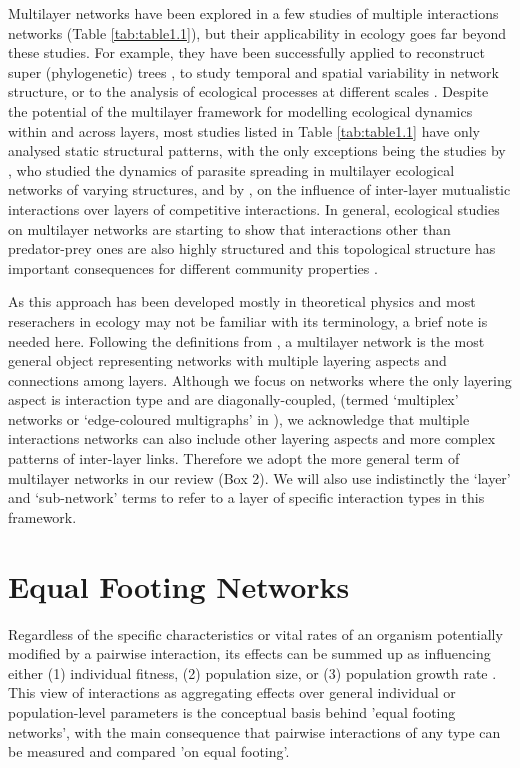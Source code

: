 Multilayer networks have been explored in a few studies of multiple interactions networks (Table \ref{tab:table1.1}), but their applicability in ecology goes far beyond these studies. For example, they have been successfully applied to reconstruct super (phylogenetic) trees \cite{vonHaeseler2012}, to study temporal and spatial variability in network structure, or to the analysis of ecological processes at different scales \cite{Pilosof2017} . Despite the potential of the multilayer framework for modelling ecological dynamics within and across layers, most studies listed in Table \ref{tab:table1.1} have only analysed static structural patterns, with the only exceptions being the studies by \cite{Stella2016}, who studied the dynamics of parasite spreading in multilayer ecological networks of varying structures, and by \cite{Gracia-Lazaro2018}, on the influence of inter-layer mutualistic interactions over layers of competitive interactions. In general, ecological studies on multilayer networks are starting to show that interactions other than predator-prey ones are also highly structured \citep{Melian2009,Kefi2015} and this topological structure has important consequences for different community properties \citep{Pocock2012, Evans2013a, Kefi2016a}.

As this approach has been developed mostly in theoretical physics and most reserachers in ecology may not be familiar with its terminology, a brief note is needed here. Following the definitions from \cite{Kivela2014}, a multilayer network is the most general object representing networks with multiple layering aspects and connections among layers. Although we focus on networks where the only layering aspect is interaction type and are diagonally-coupled, (termed `multiplex' networks or `edge-coloured multigraphs' in \citealt{Kivela2014}), we acknowledge that multiple interactions networks can also include other layering aspects and more complex patterns of inter-layer links. Therefore we adopt the more general term of multilayer networks in our review (Box 2). We will also use indistinctly the `layer' and `sub-network' terms to refer to a layer of specific interaction types in this framework.

\section*{Equal Footing Networks}

Regardless of the specific characteristics or vital rates of an organism potentially modified by a pairwise interaction, its effects can be summed up as influencing either (1) individual fitness, (2) population size, or (3) population growth rate \citep{Abrams1987}. This view of interactions as aggregating effects over general individual or population-level parameters is the conceptual basis behind {}'equal footing networks{}', with the main consequence that pairwise interactions of any type can be measured and compared {}'on equal footing'.

